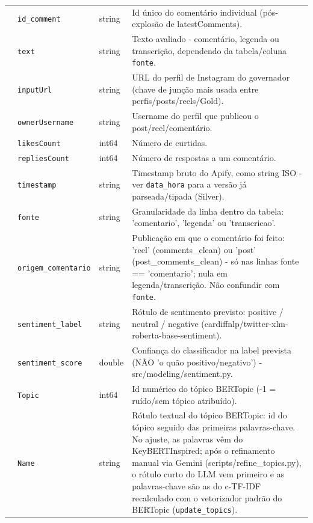 \begin{footnotesize}
\begin{longtable}{p{3.2cm}p{3.0cm}p{2.0cm}p{6.0cm}}
\texttt{} & \texttt{id\_\allowbreak{}comment} & string & Id único do comentário individual (pós-explosão de latestComments). \\
\texttt{} & \texttt{text} & string & Texto avaliado - comentário, legenda ou transcrição, dependendo da tabela/\allowbreak{}coluna \texttt{fonte}. \\
\texttt{} & \texttt{inputUrl} & string & URL do perfil de Instagram do governador (chave de junção mais usada entre perfis/\allowbreak{}posts/\allowbreak{}reels/\allowbreak{}Gold). \\
\texttt{} & \texttt{ownerUsername} & string & Username do perfil que publicou o post/\allowbreak{}reel/\allowbreak{}comentário. \\
\texttt{} & \texttt{likesCount} & int64 & Número de curtidas. \\
\texttt{} & \texttt{repliesCount} & int64 & Número de respostas a um comentário. \\
\texttt{} & \texttt{timestamp} & string & Timestamp bruto do Apify, como string ISO - ver \texttt{data\_\allowbreak{}hora} para a versão já parseada/\allowbreak{}tipada (Silver). \\
\texttt{} & \texttt{fonte} & string & Granularidade da linha dentro da tabela: 'comentario', 'legenda' ou 'transcricao'. \\
\texttt{} & \texttt{origem\_\allowbreak{}comentario} & string & Publicação em que o comentário foi feito: 'reel' (comments\_\allowbreak{}clean) ou 'post' (post\_\allowbreak{}comments\_\allowbreak{}clean) - só nas linhas fonte == 'comentario'; nula em legenda/\allowbreak{}transcrição. Não confundir com \texttt{fonte}. \\
\texttt{} & \texttt{sentiment\_\allowbreak{}label} & string & Rótulo de sentimento previsto: positive /\allowbreak{} neutral /\allowbreak{} negative (cardiffnlp/\allowbreak{}twitter-xlm-roberta-base-sentiment). \\
\texttt{} & \texttt{sentiment\_\allowbreak{}score} & double & Confiança do classificador na label prevista (NÃO 'o quão positivo/\allowbreak{}negativo') - src/\allowbreak{}modeling/\allowbreak{}sentiment.py. \\
\texttt{} & \texttt{Topic} & int64 & Id numérico do tópico BERTopic (-1 = ruído/\allowbreak{}sem tópico atribuído). \\
\texttt{} & \texttt{Name} & string & Rótulo textual do tópico BERTopic: id do tópico seguido das primeiras palavras-chave. No ajuste, as palavras vêm do KeyBERTInspired; após o refinamento manual via Gemini (scripts/\allowbreak{}refine\_\allowbreak{}topics.py), o rótulo curto do LLM vem primeiro e as palavras-chave são as do c-TF-IDF recalculado com o vetorizador padrão do BERTopic (\texttt{update\_\allowbreak{}topics}). \\

\end{longtable}
\end{footnotesize}
